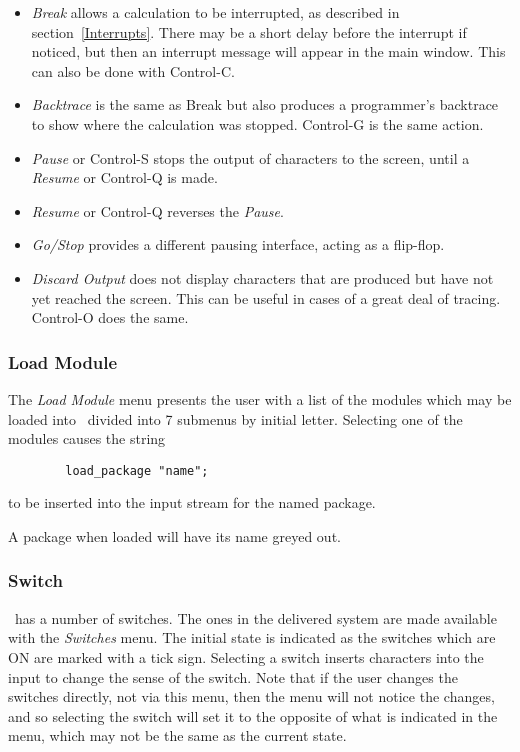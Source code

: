 \begin{itemize}
\item{\em Break}\label{Break} allows a calculation to be
interrupted, as described in section~\ref{Interrupts}.  There may be a
short delay before the interrupt if noticed, but then an interrupt
message will appear in the main window.  This can also be done with
Control-C. 

\item{\em Backtrace} is the same as Break but also produces a
  programmer's backtrace to show where the calculation was stopped.
  Control-G is the same action.

\item{\em Pause} or Control-S stops the output of characters to the
  screen, until a {\em Resume} or Control-Q is made.

\item{\em Resume} or Control-Q reverses the {\em Pause}.

\item{\em Go/Stop} provides a different pausing interface, acting as a
  flip-flop.

\item{\em Discard Output} does not display characters that are
  produced but have not yet reached the screen.  This can be useful in
  cases of a great deal of tracing.  Control-O does the same.
\end{itemize}

\subsubsection{Load Module}
\label{Library}
\label{Load}

The {\em Load Module} menu presents the user with a list of the
modules which may be loaded into \REDUCE\ divided into 7 submenus by
initial letter. 
Selecting one of the modules causes the string
\begin{verbatim}
        load_package "name";
\end{verbatim}
to be inserted into the input stream for the named package.

A package when loaded will have its name greyed out.

\subsubsection{Switch}

\REDUCE\  has a number of switches.  The ones in the delivered system are made
available with the {\em Switches} menu.  The initial state is
indicated as the switches which are ON are marked with a tick sign.
Selecting a switch inserts characters into the input to change the
sense of the switch.  Note that if the user changes the switches
directly, not via this menu, then the menu will not notice the
changes, and so selecting the switch will set it to the opposite of
what is indicated in the menu, which may not be the same as the
current state.

